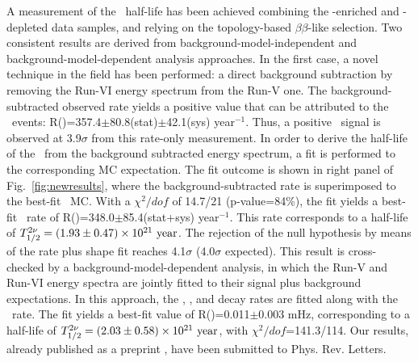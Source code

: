 A measurement of the  \bbtnu ~half-life has been achieved combining the -enriched and -depleted data samples, and relying on the topology-based $\beta\beta$-like selection. Two consistent results are derived from background-model-independent and background-model-dependent analysis approaches. In the first case, a novel technique in the field has been performed: a direct background subtraction by removing the Run-VI energy spectrum from the Run-V one. The background-subtracted observed rate yields a positive value that can be attributed to the \bbtnu ~events: R()=357.4$\pm$80.8(stat)$\pm$42.1(sys) year$^{-1}$. Thus, a positive \bbtnu ~signal is observed at 3.9$\sigma$ from this rate-only measurement. In order to derive the half-life of the  \bbtnu\ from the background subtracted energy spectrum, a fit is performed to the corresponding MC expectation. The fit outcome is shown in right panel of Fig.~\ref{fig:newresults}, where the background-subtracted rate is superimposed to the best-fit \bbtnu ~MC. With a $\chi^{2}/dof$ of 14.7/21 (p-value=84\%), the fit yields a best-fit \bbtnu ~rate of R()=348.0$\pm$85.4(stat+sys) year$^{-1}$. This rate corresponds to a half-life of $T_{1/2}^{2\nu}=(1.93\pm0.47)\times10^{21}~\textrm{year}$. The rejection of the null hypothesis by means of the rate plus shape fit reaches 4.1$\sigma$ (4.0$\sigma$ expected). This result is cross-checked by a background-model-dependent analysis, in which the Run-V and Run-VI energy spectra are jointly fitted to their signal plus background expectations. In this approach, the , ,  and  decay rates are fitted along with the \bbtnu ~rate. The fit yields a best-fit value of R()=0.011$\pm$0.003 mHz, corresponding to a half-life of $T_{1/2}^{2\nu}=(2.03\pm0.58)\times10^{21}~\textrm{year}$, with $\chi^2/dof$=141.3/114. Our results, already published as
a preprint \cite{nextcollaboration2021measurement}, have been submitted to Phys. Rev. Letters. 


